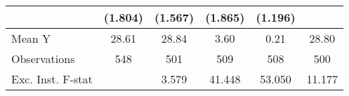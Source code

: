 {\begin{tabular}{l*{5}{c}}
            &     (1.804)         &     (1.567)         &     (1.865)         &     (1.196)         &                     \\
\midrule
Mean Y      &       28.61         &       28.84         &        3.60         &        0.21         &       28.80         \\
Observations&         548         &         501         &         509         &         508         &         500         \\
Exc. Inst. F-stat&                     &       3.579         &      41.448         &      53.050         &      11.177         \\
\bottomrule
\end{tabular}
}
